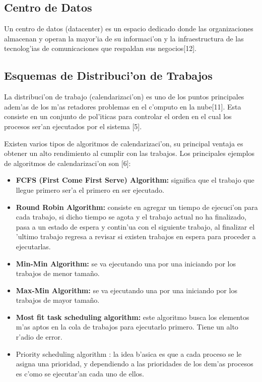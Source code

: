 
\subsection*{Centro de Datos}
Un centro de datos (datacenter) es un espacio dedicado donde las organizaciones almacenan y operan la mayor'ia de su informaci'on y la infraestructura de las tecnolog'ias de comunicaciones que respaldan sus negocios[12].

\subsection*{Esquemas de Distribuci'on de Trabajos}

La distribuci'on de trabajo (calendarizaci'on) es uno de los puntos principales adem'as de los m'as retadores problemas en el c'omputo en la nube[11]. Esta consiste en un conjunto de pol'iticas para controlar el orden en el cual los procesos ser'an ejecutados por el sistema [5].

Existen varios tipos de algoritmos de calendarizaci'on, su principal ventaja es obtener un alto rendimiento al cumplir con las trabajos. Los principales ejemplos de algoritmos de calendarizaci'on son [6]:

\begin{itemize}
\item \textbf{FCFS (First Come First Serve) Algorithm:} significa que el trabajo que llegue primero ser'a el primero en ser ejecutado.
\item \textbf{Round Robin Algorithm:} consiste en agregar un tiempo de ejecuci'on para cada trabajo, si dicho tiempo se agota y el trabajo actual no ha finalizado, pasa a un estado de espera y contin'ua con el siguiente trabajo, al finalizar el 'ultimo trabajo regresa a revisar si existen trabajos en espera para proceder a ejecutarlas. 
\item  \textbf{Min-Min Algorithm:} se va ejecutando una por una iniciando por los trabajos de menor tamaño.
\item  \textbf{Max-Min Algorithm:} se va ejecutando una por una iniciando por los trabajos de mayor tamaño.
\item  \textbf{Most fit task scheduling algorithm:} este algoritmo busca los elementos m'as aptos en la cola de trabajos para ejecutarlo primero. Tiene un alto r'adio de error.
\item Priority scheduling algorithm : la idea b'asica es que a cada proceso se le asigna una prioridad, y dependiendo a las prioridades de los dem'as procesos es c'omo se ejecutar'an cada uno de ellos.
\end{itemize}

